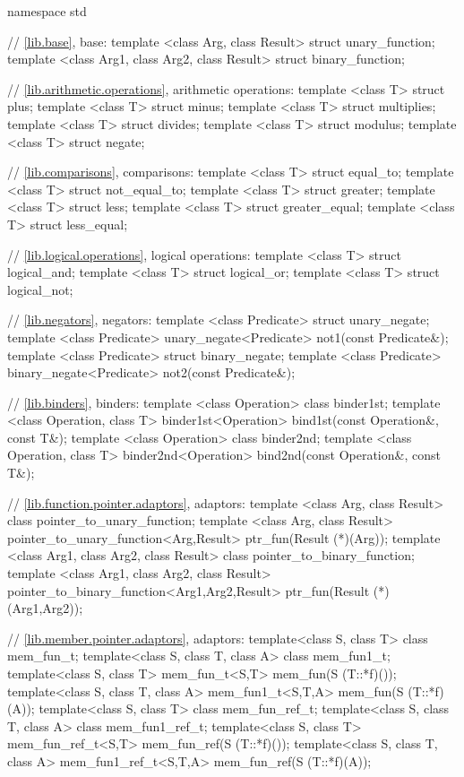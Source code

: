 %
\begin{codeblock}
namespace std {
  // \ref{lib.base}, base:
  template <class Arg, class Result> struct unary_function;
  template <class Arg1, class Arg2, class Result> struct binary_function;

  // \ref{lib.arithmetic.operations}, arithmetic operations:
  template <class T> struct plus;
  template <class T> struct minus;
  template <class T> struct multiplies;
  template <class T> struct divides;
  template <class T> struct modulus;
  template <class T> struct negate;

  // \ref{lib.comparisons}, comparisons:
  template <class T> struct equal_to;
  template <class T> struct not_equal_to;
  template <class T> struct greater;
  template <class T> struct less;
  template <class T> struct greater_equal;
  template <class T> struct less_equal;

  // \ref{lib.logical.operations}, logical operations:
  template <class T> struct logical_and;
  template <class T> struct logical_or;
  template <class T> struct logical_not;

  // \ref{lib.negators}, negators:
  template <class Predicate> struct unary_negate;
  template <class Predicate>
    unary_negate<Predicate>  not1(const Predicate&);
  template <class Predicate> struct binary_negate;
  template <class Predicate>
    binary_negate<Predicate> not2(const Predicate&);

  // \ref{lib.binders}, binders:
  template <class Operation>  class binder1st;
  template <class Operation, class T>
    binder1st<Operation> bind1st(const Operation&, const T&);
  template <class Operation> class binder2nd;
  template <class Operation, class T>
    binder2nd<Operation> bind2nd(const Operation&, const T&);

  // \ref{lib.function.pointer.adaptors}, adaptors:
  template <class Arg, class Result> class pointer_to_unary_function;
  template <class Arg, class Result>
    pointer_to_unary_function<Arg,Result> ptr_fun(Result (*)(Arg));
  template <class Arg1, class Arg2, class Result>
    class pointer_to_binary_function;
  template <class Arg1, class Arg2, class Result>
    pointer_to_binary_function<Arg1,Arg2,Result>
      ptr_fun(Result (*)(Arg1,Arg2));

  // \ref{lib.member.pointer.adaptors}, adaptors:
  template<class S, class T> class mem_fun_t;
  template<class S, class T, class A> class mem_fun1_t;
  template<class S, class T>
      mem_fun_t<S,T> mem_fun(S (T::*f)());
  template<class S, class T, class A>
      mem_fun1_t<S,T,A> mem_fun(S (T::*f)(A));
  template<class S, class T> class mem_fun_ref_t;
  template<class S, class T, class A> class mem_fun1_ref_t;
  template<class S, class T>
      mem_fun_ref_t<S,T> mem_fun_ref(S (T::*f)());
  template<class S, class T, class A>
      mem_fun1_ref_t<S,T,A> mem_fun_ref(S (T::*f)(A));

}
\end{codeblock}
